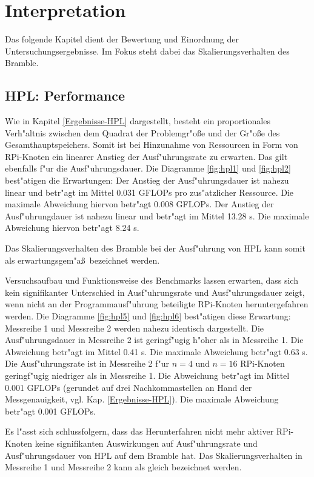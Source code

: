 \chapter{Interpretation}\label{Kap4}

Das folgende Kapitel dient der Bewertung und Einordnung der Untersuchungsergebnisse. Im Fokus steht dabei das Skalierungsverhalten des Bramble.    

\section{HPL: Performance}\label{Interpretation-Linpack}
Wie in Kapitel \ref{Ergebnisse-HPL} dargestellt, besteht ein proportionales Verh"altnis zwischen dem Quadrat der Problemgr"o\ss e und der Gr"o\ss e des Gesamthauptspeichers. Somit ist bei Hinzunahme von Ressourcen in Form von RPi-Knoten ein linearer Anstieg der Ausf"uhrungsrate zu erwarten. Das gilt ebenfalls f"ur die Ausf"uhrungsdauer. Die Diagramme \ref{fig:hpl1} und \ref{fig:hpl2} best"atigen die Erwartungen: Der Anstieg der Ausf"uhrungsdauer ist nahezu linear und betr"agt im Mittel 0.031 GFLOPs pro zus"atzlicher Ressource. Die maximale Abweichung hiervon betr"agt 0.008 GFLOPs. Der Anstieg der Ausf"uhrungdauer ist nahezu linear und betr"agt im Mittel 13.28 s. Die maximale Abweichung hiervon betr"agt 8.24 s.

Das Skalierungsverhalten des Bramble bei der Ausf"uhrung von HPL kann somit als erwartungsgem"a\ss\ bezeichnet werden.

Versuchsaufbau und Funktionsweise des Benchmarks lassen erwarten, dass sich kein signifikanter Unterschied in Ausf"uhrungsrate und Ausf"uhrungsdauer zeigt, wenn nicht an der Programmausf"uhrung beteiligte RPi-Knoten heruntergefahren werden. Die Diagramme \ref{fig:hpl5} und \ref{fig:hpl6} best"atigen diese Erwartung: Messreihe 1 und Messreihe 2 werden nahezu identisch dargestellt. Die Ausf"uhrungsdauer in Messreihe 2 ist geringf"ugig h"oher als in Messreihe 1. Die Abweichung betr"agt im Mittel 0.41 s. Die maximale Abweichung betr"agt 0.63 s. Die Ausf"uhrungsrate ist in Messreihe 2 f"ur $n=4$ und $n=16$ RPi-Knoten geringf"ugig niedriger als in Messreihe 1. Die Abweichung betr"agt im Mittel 0.001 GFLOPs (gerundet auf drei Nachkommastellen an Hand der Messgenauigkeit, vgl. Kap. \ref{Ergebnisse-HPL}). Die maximale Abweichung betr"agt 0.001 GFLOPs. 

Es l"asst sich schlussfolgern, dass das Herunterfahren nicht mehr aktiver RPi-Knoten keine signifikanten Auswirkungen auf Ausf"uhrungsrate und Ausf"uhrungsdauer von HPL auf dem Bramble hat. Das Skalierungsverhalten in Messreihe 1 und Messreihe 2 kann als gleich bezeichnet werden. 

